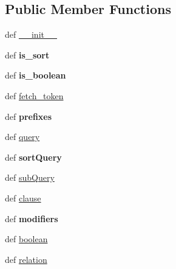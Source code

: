 \subsection*{Public Member Functions}
\begin{DoxyCompactItemize}
\item 
def \hyperlink{classcheshire3_1_1cql_parser_1_1_c_q_l_parser_a4fd8de94f248b45fa308eef7180d3d27}{\-\_\-\-\_\-init\-\_\-\-\_\-}
\item 
\hypertarget{classcheshire3_1_1cql_parser_1_1_c_q_l_parser_acfa12217571f4de38ae090b504ac3abb}{def {\bfseries is\-\_\-sort}}\label{classcheshire3_1_1cql_parser_1_1_c_q_l_parser_acfa12217571f4de38ae090b504ac3abb}

\item 
\hypertarget{classcheshire3_1_1cql_parser_1_1_c_q_l_parser_a0b34a7e6139b4d7ca0848492b63b70df}{def {\bfseries is\-\_\-boolean}}\label{classcheshire3_1_1cql_parser_1_1_c_q_l_parser_a0b34a7e6139b4d7ca0848492b63b70df}

\item 
def \hyperlink{classcheshire3_1_1cql_parser_1_1_c_q_l_parser_aff5b1158f10e264115103448db057bc9}{fetch\-\_\-token}
\item 
\hypertarget{classcheshire3_1_1cql_parser_1_1_c_q_l_parser_a47866b982129f3786a2c424e853c33a4}{def {\bfseries prefixes}}\label{classcheshire3_1_1cql_parser_1_1_c_q_l_parser_a47866b982129f3786a2c424e853c33a4}

\item 
def \hyperlink{classcheshire3_1_1cql_parser_1_1_c_q_l_parser_ac110db66ad3a4abebdabbf3c480c1785}{query}
\item 
\hypertarget{classcheshire3_1_1cql_parser_1_1_c_q_l_parser_af3653da64656e9278334bbc901e0b4b6}{def {\bfseries sort\-Query}}\label{classcheshire3_1_1cql_parser_1_1_c_q_l_parser_af3653da64656e9278334bbc901e0b4b6}

\item 
def \hyperlink{classcheshire3_1_1cql_parser_1_1_c_q_l_parser_a37b688e3ac3763455e7f89166ca6ead5}{sub\-Query}
\item 
def \hyperlink{classcheshire3_1_1cql_parser_1_1_c_q_l_parser_a92dbeaa499c354adda262feb70f14623}{clause}
\item 
\hypertarget{classcheshire3_1_1cql_parser_1_1_c_q_l_parser_a88941c7b6a224c58b91ddf6ee821f9d3}{def {\bfseries modifiers}}\label{classcheshire3_1_1cql_parser_1_1_c_q_l_parser_a88941c7b6a224c58b91ddf6ee821f9d3}

\item 
def \hyperlink{classcheshire3_1_1cql_parser_1_1_c_q_l_parser_af28692595eaa62c93f013818d3812962}{boolean}
\item 
def \hyperlink{classcheshire3_1_1cql_parser_1_1_c_q_l_parser_ae408fbe2b4e991e06c9a148057e5c497}{relation}
\end{DoxyCompactItemize}
